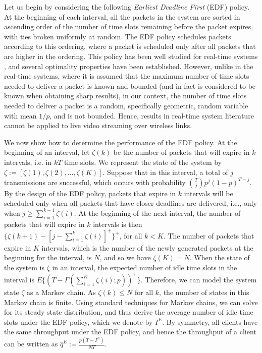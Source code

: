 \documentclass[10pt,nocopyrightspace]{sigplan-proc-varsize-1in}
\begin{document}
Let us begin by considering the following \emph{Earliest Deadline First} (EDF) policy. At the beginning of each interval, all the packets in the system are sorted in ascending order of the number of time slots remaining before the packet expires, with ties broken uniformly at random. The EDF policy schedules packets according to this ordering, where a packet is scheduled only after all packets that are higher in the ordering. This policy has been well studied for real-time systems \cite{CLL73}, and several optimality properties have been established. However, unlike in the real-time systems, where it is assumed that the maximum number of time slots needed to deliver a packet is known and bounded (and in fact is considered to be known when obtaining sharp results), in our context, the number of time slots needed to deliver a packet is a random, specifically geometric, random variable with mean $1/p$, and is not bounded. Hence, results in real-time system literature cannot be applied to live video streaming over wireless links.

We now show how to determine the performance of the EDF policy. At the beginning of an interval, let $\zeta(k)$ be the number of packets that will expire in $k$ intervals, i.e. in $k T$ time slots. We represent the state of the system by $\zeta:=[\zeta(1), \zeta(2), \dots, \zeta(K)]$. Suppose that in this interval, a total of $j$ transmissions are successful, which occurs with probability ${T\choose j}p^j(1-p)^{T-j}$. By the design of the EDF policy, packets that expire in $k$ intervals will be scheduled only when all packets that have closer deadlines are delivered, i.e., only when $j\geq\sum_{i=1}^{k-1}\zeta(i)$. At the beginning of the next interval, the number of packets that will expire in $k$ intervals is then $\{\zeta(k+1)-[j-\sum_{i=1}^k\zeta(i)]^+\}^+$, for all $k< K$. The number of packets that expire in $K$ intervals, which is the number of the newly generated packets at the beginning for the interval, is $N$, and so we have $\zeta(K)=N$. When the state of the system is $\zeta$ in an interval, the expected number of idle time slots in the interval is $E\{(T-\Gamma(\sum_{i=1}^{K}\zeta(i);p))^+\}$. Therefore, we can model the system state $\zeta$ as a Markov chain. As $\zeta(k)\leq N$ for all $k$, the number of states in this Markov chain is finite. Using standard techniques for Markov chains, we can solve for its steady state distribution, and thus derive the average number of idle time slots under the EDF policy, which we denote by $I^{E}$. By symmetry, all clients have the same throughput under the EDF policy, and hence the throughput of a client can be written as $\hat{q}^{E}:=\frac{p(T-I^{E})}{NT}$.
\end{document}
